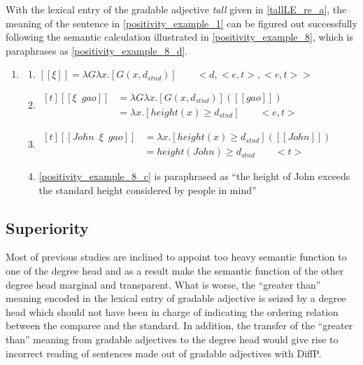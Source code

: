 \documentclass{ctexart}
\begin{document}
With the lexical entry of the gradable adjective \textit{tall} given in \ref{tallLE_re_a}, the meaning of the sentence in \ref{positivity_example_1} can be figured out successfully following the semantic calculation illustrated in \ref{positivity_example_8}, which is paraphrases as \ref{positivity_example_8_d}.

\begin{enumerate}
    \item \label{positivity_example_8}
    \begin{enumerate}
        \item \label{positivity_example_8_a}
        $[\![\xi]\!]=\lambda G \lambda x. [G(x,d_{stnd})] \qquad <d,<e,t>,<e,t>>$

        \item \label{positivity_example_8_b}
        $\begin{aligned}[t]
            [\![\xi \enspace gao]\!] &= \lambda G \lambda x. [G(x,d_{stnd})]([\![gao]\!]) \\
            &= \lambda x.[height(x) \geq d_{stnd}] \qquad <e,t>
        \end{aligned}$

        \item \label{positivity_example_8_c}
        $\begin{aligned}[t]
            [\![John \enspace \xi \enspace gao]\!] &= \lambda x.[height(x) \geq d_{stnd}]([\![John]\!]) \\
            &= height(John) \geq d_{stnd} \qquad <t>
        \end{aligned}$

        \item \label{positivity_example_8_d}
        \ref{positivity_example_8_c} is paraphrased as ``the height of John exceeds the standard height considered by people in mind''

    \end{enumerate}
\end{enumerate}

\subsection{Superiority}

Most of previous studies are inclined to appoint too heavy semantic function to one of the degree head and as a result make the semantic function of the other degree head marginal and transparent. What is worse, the ``greater than'' meaning encoded in the lexical entry of gradable adjective is seized by a degree head which should not have been in charge of indicating the ordering relation between the comparee and the standard. In addition, the transfer of the ``greater than'' meaning from gradable adjectives to the degree head would give rise to incorrect reading of sentences made out of gradable adjectives with DiffP.
\end{document}
